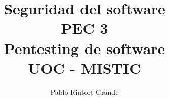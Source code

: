 \documentclass[a4paper,oneside]{article}
\author{Pablo Riutort Grande}
\title{
	Seguridad del software\\
	\vspace{0.5cm}
	PEC 3\\
	\vspace{1cm}
	\textbf{Pentesting de software}
	\vspace{1cm}\\UOC - MISTIC
}
\begin{document}
\maketitle
\pagebreak
\tableofcontents
\lstlistoflistings
\listoffigures
\listoftables

\pagebreak

\end{document}
